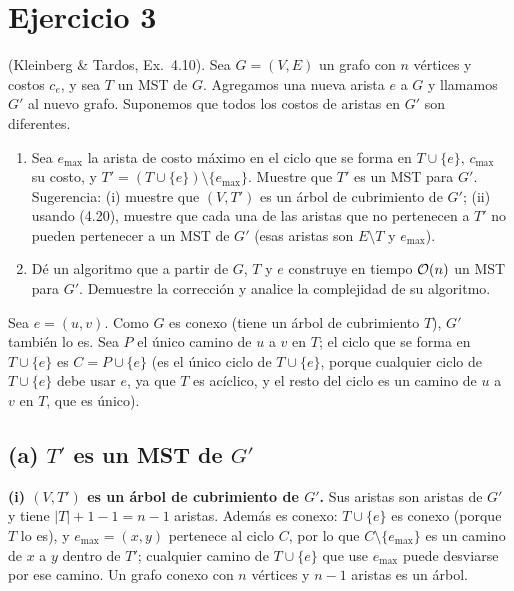 \section{Ejercicio 3}
\begin{enunciado}
(Kleinberg \& Tardos, Ex.~4.10). Sea $G=(V,E)$ un grafo con $n$ vértices y costos $c_e$, y sea $T$ un MST de $G$. Agregamos una nueva arista $e$ a $G$ y llamamos $G'$ al nuevo grafo. Suponemos que todos los costos de aristas en $G'$ son diferentes.
\begin{enumerate}[label=(\alph*)]
\item Sea $e_{\max}$ la arista de costo máximo en el ciclo que se forma en $T\cup\{e\}$, $c_{\max}$ su costo, y $T'=(T\cup\{e\})\setminus\{e_{\max}\}$. Muestre que $T'$ es un MST para $G'$. Sugerencia: (i) muestre que $(V,T')$ es un árbol de cubrimiento de $G'$; (ii) usando (4.20), muestre que cada una de las aristas que no pertenecen a $T'$ no pueden pertenecer a un MST de $G'$ (esas aristas son $E\setminus T$ y $e_{\max}$).
\item Dé un algoritmo que a partir de $G$, $T$ y $e$ construye en tiempo $\mathcal{O}(n)$ un MST para $G'$. Demuestre la corrección y analice la complejidad de su algoritmo.
\end{enumerate}
\end{enunciado}


Sea $e=(u,v)$. Como $G$ es conexo (tiene un árbol de cubrimiento $T$), $G'$ también lo es. Sea $P$ el único camino de $u$ a $v$ en $T$; el ciclo que se forma en $T\cup\{e\}$ es $C=P\cup\{e\}$ (es el único ciclo de $T\cup\{e\}$, porque cualquier ciclo de $T\cup\{e\}$ debe usar $e$, ya que $T$ es acíclico, y el resto del ciclo es un camino de $u$ a $v$ en $T$, que es único).

\subsection*{(a) $T'$ es un MST de $G'$}

\textbf{(i) $(V,T')$ es un árbol de cubrimiento de $G'$.} Sus aristas son aristas de $G'$ y tiene $|T|+1-1=n-1$ aristas. Además es conexo: $T\cup\{e\}$ es conexo (porque $T$ lo es), y $e_{\max}=(x,y)$ pertenece al ciclo $C$, por lo que $C\setminus\{e_{\max}\}$ es un camino de $x$ a $y$ dentro de $T'$; cualquier camino de $T\cup\{e\}$ que use $e_{\max}$ puede desviarse por ese camino. Un grafo conexo con $n$ vértices y $n-1$ aristas es un árbol.

